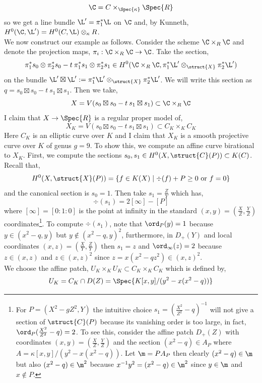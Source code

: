\[ \C = C \times_{\Spec{\kappa}} \Spec{R} \]
so we get a line bundle $\L' = \pi_1^* \L$ on $\C$ and, by Kunneth, $H^0(\C, \L') = H^0(C, \L) \otimes_\kappa R$.   
\bigskip\\
We now construct our example as follows. Consider the scheme $\C \times_R \C$ and denote the projection maps, $\pi_i : \C \times_R \C \to \C$. Take the section,
\[ \pi_1^* s_0 \otimes \pi_2^* s_0 - t \: \pi_1^* s_1 \otimes \pi_2^* s_1 \in H^0(\C \times_R \C, \pi_1^* \L' \otimes_{\struct{X}} \pi_2^* \L') \]
on the bundle $\L' \boxtimes \L' := \pi_1^* \L' \otimes_{\struct{X}} \pi_2^* \L'$. We will write this section as $q = s_0 \boxtimes s_0 - t \: s_1 \boxtimes s_1$. Then we take,
\[ X = V(s_0 \boxtimes s_0 - t \: s_1 \boxtimes s_1) \subset \C \times_R \C \]
I claim that $X \to \Spec{R}$ is a regular proper model of,
\[ X_K = V(s_0 \boxtimes s_0 - t \: s_1 \boxtimes s_1) \subset C_K \times_K C_K \]
Here $C_K$ is an elliptic curve over $K$ and I claim that $X_K$ is a smooth projective curve over $K$ of genus $g = 9$. To show this, we compute an affine curve birational to $X_K$. First, we compute the sections $s_0, s_1 \in H^0(X, \struct{C}(P)) \subset K(C)$. Recall that,
\[ H^0(X, \struct{X}(P)) = \{ f \in K(X) \mid \div{(f)} + P \ge 0 \text{ or } f = 0 \} \]
and the canonical section is $s_0 = 1$. Then take $s_1 = \frac{Z}{Y}$ which has, 
\[ \div{(s_1)} = 2 [\infty] - [P] \]
where $[\infty] = [0 : 1 : 0]$ is the point at infinity in the standard $(x, y) = (\frac{X}{Z}, \frac{Y}{Z})$ coordinates\footnote{For $P = (X^2 - g Z^2, Y)$ the intuitive choice $s_1 = (\frac{X^2}{Z^2} - q)^{-1}$ will not give a section of $\struct{C}(P)$ because its vanishing order is too large, in fact, $\ord_{P}{(\frac{X^2}{Z^2} - q)} = 2$. To see this, consider the affine patch $D_{+}(Z)$ with coordinates $(x, y) = (\frac{X}{Z}, \frac{Y}{Z})$ and the section $(x^2 - q) \in A_{P}$ where $A = \kappa[x, y]/(y^2 - x(x^2 - q))$. Let $\m = P A_P$ then clearly $(x^2 - q) \in \m$ but also $(x^2 - q) \in \m^2$ because $x^{-1} y^2 = (x^2 - q) \in \m^2$ since $y \in \m$ and $x \notin P$.}. To compute $\div{(s_1)}$, note that $\ord_{P}(y) = 1$ because $y \in (x^2 - q, y)$ but $y \notin (x^2 - q, y)^2$, furthermore, in $D_+(Y)$ and local coordinates $(x,z) = (\frac{X}{Y}, \frac{Z}{Y})$ then $s_1 = z$ and $\ord_{\infty}(z) = 2$ because $z \in (x, z)$ and $z \in (x, z)^2$ since $z = x(x^2 - q z^2) \in (x, z)^2$. 
\bigskip\\
We choose the affine patch, $U_K \times_K U_K \subset C_K \times_K C_K$ which is defined by,
\[ U_K = C_K \cap D(Z) = \Spec{K[x,y]/(y^2 - x(x^2 - q))} \]

